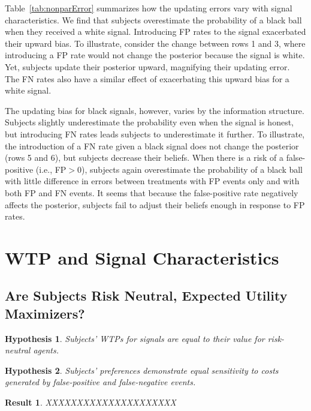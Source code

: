 \documentclass[12pt,a4paper]{article}
\newtheorem{hypothesis}{Hypothesis}
\newtheorem{result}{Result}
\begin{document}
Table~\ref{tab:nonparError} summarizes how the updating errors vary with signal characteristics. We find that subjects overestimate the probability of a black ball when they received a white signal. Introducing FP rates to the signal exacerbated their upward bias. To illustrate, consider the change between rows 1 and 3, where introducing a FP rate would not change the posterior because the signal is white. Yet, subjects update their posterior upward, magnifying their updating error. The FN rates also have a similar effect of exacerbating this upward bias for a white signal.

The updating bias for black signals, however, varies by the information structure. Subjects slightly underestimate the probability even when the signal is honest, but introducing FN rates leads subjects to underestimate it further. To illustrate, the introduction of a FN rate given a black signal does not change the posterior (rows 5 and 6), but subjects decrease their beliefs. When there is a risk of a false-positive (i.e., FP$>$0), subjects again overestimate the probability of a black ball with little difference in errors between treatments with FP events only and with both FP and FN events. It seems that because the false-positive rate negatively affects the posterior, subjects fail to adjust their beliefs enough in response to FP rates.




\section{WTP and Signal Characteristics}\label{sec:results}

\subsection{Are Subjects Risk Neutral, Expected Utility Maximizers?} 

\begin{hypothesis}\label{hyp:eqRN} 
Subjects' WTPs for signals are equal to their value for risk-neutral agents. 
\end{hypothesis}

\begin{hypothesis}\label{hyp:eqSen} 
Subjects' preferences demonstrate equal sensitivity to costs generated by false-positive and false-negative events. 
\end{hypothesis}

\begin{result} 
XXXXXXXXXXXXXXXXXXXXX
\end{result}
\end{document}
